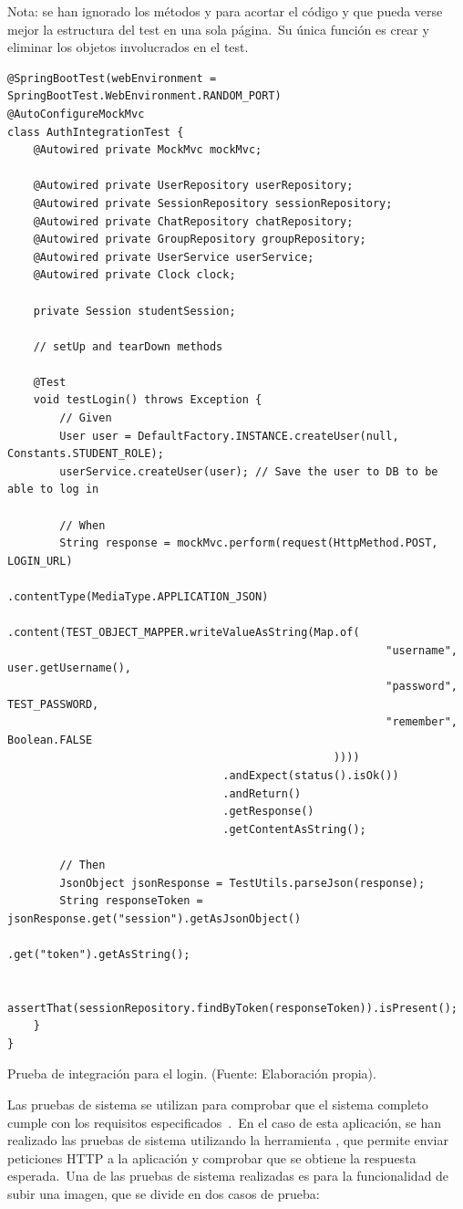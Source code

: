 	{\footnotesize Nota: se han ignorado los métodos  y  para acortar el código y
que pueda verse mejor la estructura del test en una sola página.\ Su única función es crear y eliminar los objetos
involucrados en el test.}
\begin{codeBlock}
	\begin{verbatim}
@SpringBootTest(webEnvironment = SpringBootTest.WebEnvironment.RANDOM_PORT)
@AutoConfigureMockMvc
class AuthIntegrationTest {
	@Autowired private MockMvc mockMvc;

	@Autowired private UserRepository userRepository;
	@Autowired private SessionRepository sessionRepository;
	@Autowired private ChatRepository chatRepository;
	@Autowired private GroupRepository groupRepository;
	@Autowired private UserService userService;
	@Autowired private Clock clock;

	private Session studentSession;

	// setUp and tearDown methods

	@Test
	void testLogin() throws Exception {
		// Given
		User user = DefaultFactory.INSTANCE.createUser(null, Constants.STUDENT_ROLE);
		userService.createUser(user); // Save the user to DB to be able to log in

		// When
		String response = mockMvc.perform(request(HttpMethod.POST, LOGIN_URL)
												  .contentType(MediaType.APPLICATION_JSON)
												  .content(TEST_OBJECT_MAPPER.writeValueAsString(Map.of(
														  "username", user.getUsername(),
														  "password", TEST_PASSWORD,
														  "remember", Boolean.FALSE
												  ))))
								 .andExpect(status().isOk())
								 .andReturn()
								 .getResponse()
								 .getContentAsString();

		// Then
		JsonObject jsonResponse = TestUtils.parseJson(response);
		String responseToken = jsonResponse.get("session").getAsJsonObject()
                                           .get("token").getAsString();

		assertThat(sessionRepository.findByToken(responseToken)).isPresent();
	}
}
	\end{verbatim}
	\caption{Prueba de integración para el login. (Fuente: Elaboración propia).}
	\label{code:pruebas-integracion-login}
\end{codeBlock}


Las pruebas de sistema se utilizan para comprobar que el sistema completo
cumple con los requisitos especificados~\cite{system_testing}.\ En el caso de esta aplicación, se han realizado
las pruebas de sistema
utilizando la herramienta , que permite enviar peticiones HTTP a la aplicación y comprobar que se
obtiene la respuesta esperada.\ Una de las pruebas de sistema realizadas es para la funcionalidad de
subir una imagen, que se divide en dos casos de prueba:

